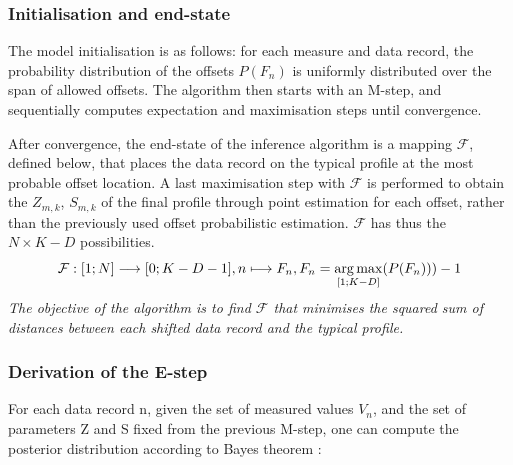 \subsubsection{Initialisation and end-state}
The model initialisation is as follows: for each measure and data record, the probability distribution of the offsets $P(F_n)$ is uniformly distributed over the span of allowed offsets. The algorithm then starts with an M-step, and sequentially computes expectation and maximisation steps until convergence.

After convergence, the end-state of the inference algorithm is a mapping $\mathcal{F}$, defined below, that places the data record on the typical profile at the most probable offset location. A last maximisation step with $\mathcal{F}$ is performed to obtain the $Z_{m,k}$, $S_{m,k}$ of the final profile through point estimation for each offset, rather than the previously used offset probabilistic estimation. $\mathcal{F}$ has thus the $N \times K-D$ possibilities.
\begin{equation}
    \mathcal{F} : [1;N] \longrightarrow [0;K-D-1],  n \longmapsto F_n, F_n = \operatorname*{arg\,max}_{[1;K-D]}(P(F_n)))-1
\end{equation}
\textit{The objective of the algorithm is to find $\mathcal{F}$ that minimises the squared sum of distances between each shifted data record and the typical profile.}

\subsubsection{Derivation of the E-step}
For each data record n, given the set of measured values $V_n$, and the set of parameters Z and S fixed from the previous M-step, one can compute the posterior distribution according to Bayes theorem \cite{olhede_2018}:

